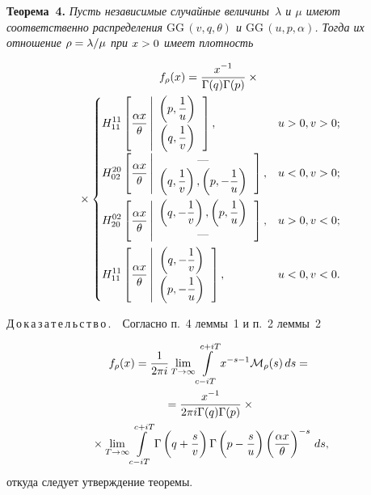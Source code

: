 \begin{multicols}{2}
\smallskip

\noindent
\textbf{Теорема~4.}
\textit{Пусть независимые случайные величины~$\lambda$ и $\mu$ имеют 
соответственно распределения $\mathrm{GG}\,(v,q,\theta)$ и $\mathrm{GG}\,(u,p,\alpha)$. Тогда их 
отношение $\rho\hm=\lambda/\mu$ при $x\hm>0$ имеет плотность}

\noindent
\begin{multline*}
f_{\rho}(x) = \fr{x^{-1}}{\Gamma(q)\Gamma(p)}\times{}\\
{}\times
\begin{cases}
\displaystyle H_{11}^{11}
\left[\fr{\alpha x}{\theta} \left\vert
\begin{array}{c}
\left(p,\fr{1}{u}\right)\\[7pt]
\left(q,\fr{1}{v}\right)
\end{array}\right. \right], &u>0, v>0;\\[16pt]
\displaystyle H_{02}^{20}
\left[\fr{\alpha x}{\theta} \left\vert 
\begin{array}{c}
\mbox{---}\\
\left(q,\fr{1}{v}\right),\left(p,-\fr{1}{u}\right)
\end{array}\right.
\right]   , &u<0, v>0;\\[16pt]
\displaystyle H_{20}^{02}
\left[\fr{\alpha x}{\theta} \left\vert 
\begin{array}{c}
\left(q,-\fr{1}{v}\right),\left(p,\fr{1}{u}\right)\\
\mbox{---}
\end{array}\right.
\right]   , &u>0, v<0;\\[16pt]
\displaystyle H_{11}^{11}
\left[\fr{\alpha x}{\theta} \left\vert 
\begin{array}{c}
\left(q,-\fr{1}{v}\right)\\[7pt]
\left(p,-\fr{1}{u}\right)
\end{array}\right.
\right]   , &u<0, v<0.
\end{cases}\hspace*{-0.1052pt}
\end{multline*}



\noindent
Д\,о\,к\,а\,з\,а\,т\,е\,л\,ь\,с\,т\,в\,о\,.\ \ Согласно п.~4 леммы~1 и п.~2 леммы~2

\vspace*{-3pt}

\noindent
\begin{multline*}
f_{\rho}(x) = \fr{1}{2\pi i}\lim\limits_{T\to\infty}\int\limits_{c-iT}^{c+iT}x^{-s-1}
\mathcal{M}_{\rho}(s) \, ds={}\\
{}= \fr{x^{-1}}{2\pi i\Gamma(q)\Gamma(p)}\times{}\\
{}\times \lim_{T\to\infty}\int\limits_{c-iT}^{c+iT}
\Gamma\left(q+\fr{s}{v}\right)\Gamma\left(p-\fr{s}{u}\right)
\left(\fr{\alpha x}{\theta}\right)^{-s}\, ds,
\end{multline*}
откуда следует утверждение теоремы.


\end{multicols}

